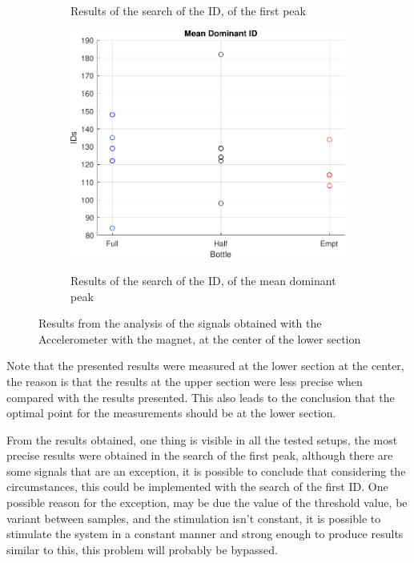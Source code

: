 \begin{figure}[]
\begin{subfigure}{0.45\textwidth}
        \caption{Results of the search of the ID, of the first peak}{}
        \label{subfig:fIDACCI}
    \end{subfigure}
    \begin{subfigure}{0.45\textwidth}
        \centering
        \includegraphics[width=\linewidth]{Chapters/6CHP/Figures/ResultsuCGraphs/Sen/BotMidAcImMa18_05mID.pdf}
        \caption{Results of the search of the ID, of the mean dominant peak}{}
        \label{subfig:mIDACCI}
    \end{subfigure}
    \caption{Results from the analysis of the signals obtained with the Accelerometer with the magnet, at the center of the lower section}{}
    \label{fig:ACCIResAlg}
\end{figure}
Note that the presented results were measured at the lower section at the center, the reason is that the results at the upper section were less precise when compared with the results presented. This also leads to the conclusion that the optimal point for the measurements should be at the lower section. 

From the results obtained, one thing is visible in all the tested setups, the most precise results were obtained in the search of the first peak, although there are some signals that are an exception, it is possible to conclude that considering the circumstances, this could be implemented with the search of the first ID. One possible reason for the exception, may be due the value of the threshold value, be variant between samples, and the stimulation isn't constant, it is possible to stimulate the system in a constant manner and strong enough to produce results similar to this, this problem will probably be bypassed. 


